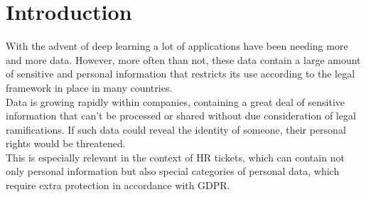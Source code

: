 \chapter{Introduction}
\label{sec:Introduction}


With the advent of deep learning a lot of applications have been needing more and more data. However, more often than not, these data contain a large amount of sensitive and personal information that restricts its use according to the legal framework in place in many countries. \\
Data is growing rapidly within companies, containing a great deal of sensitive information that can't be processed or shared without due consideration of legal ramifications. If such data could reveal the identity of someone, their personal rights would be threatened. \\
This is especially relevant in the context of HR tickets, which can contain not only personal information but also special categories of personal data, which require extra protection in accordance with GDPR. \\


